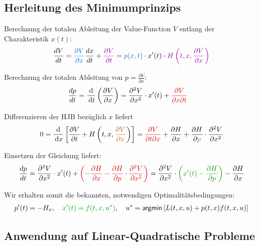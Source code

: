 \documentclass[a4paper, 12pt]{scrartcl}
\newcommand{\rot}[2][rot]{\textcolor{#1}{#2}}
\newcommand{\gruen}[2][gruen]{\textcolor{#1}{#2}}
\newcommand{\orange}[2][orange]{\textcolor{#1}{#2}}
\newcommand{\blau}[2][blau]{\textcolor{#1}{#2}}
\newcommand{\lila}[2][lila]{\textcolor{#1}{#2}}
\newcommand{\dx}{\thinspace \mathrm{d}x}
\newcommand{\dt}{\thinspace \mathrm{d}t}
\begin{document}
\subsection{Herleitung des Minimumprinzips}

Berechnung der totalen Ableitung der Value-Function $V$ entlang der Charakteristik $x(t)$:
%
\begin{align*}
\frac{dV}{dt} &= \blau{\frac{\partial V}{\partial x}} \frac{dx}{dt} + \lila{\frac{\partial V}{\partial t}} = \blau{p(x,t)} \cdot x'(t) \lila{- H\left( t,x , \frac{\partial V}{\partial x} \right)} \\
\end{align*}

Berechnung der totalen Ableitung von $p = \frac{\partial V}{\partial x}$:
%
\begin{align*}
\frac{dp}{dt} &= \frac{\mathrm{d}}{\dt} \left( \frac{\partial V}{\partial x} \right) =  \frac{\partial^2 V}{\partial x^2} \cdot x'(t) + \rot{\frac{\partial V}{\partial x \partial t}}
\end{align*}

Differenzieren der HJB bezüglich $x$ liefert
%
\begin{align*}
0 = \frac{\mathrm{d}}{\dx} \left[ \frac{\partial V}{\partial t} + H\left(t,x, \orange{ \frac{\partial V}{\partial x}} \right) \right] = \rot{\frac{\partial V}{\partial t \partial x}} + \frac{\partial H}{\partial x} + \frac{\partial H}{\partial \orange{p}} \cdot \frac{\partial^2 V}{\partial x^2}
\end{align*}

Einsetzen der Gleichung liefert:
%
\begin{align*}
\frac{dp}{dt} =  \frac{\partial^2 V}{\partial x^2} \cdot x'(t) + \rot{\left(- \frac{\partial H}{\partial x} - \frac{\partial H}{\partial p} \cdot \frac{\partial^2 V}{\partial x^2} \right)}
= \frac{\partial^2 V}{\partial x^2} \cdot \gruen{\left(x'(t) - \frac{\partial H}{\partial p} \right)} - \frac{\partial H}{\partial x}
\end{align*}

Wir erhalten somit die bekannten, notwendigen Optimalitätsbedingungen:
%
\begin{align*}
p'(t) = -H_x , \quad \gruen{x'(t) = f(t,x,u^*)}, \quad u^* = \textsf{argmin} \left[ L(t,x,u)+ p(t,x)f(t,x,u) \right]
\end{align*}

\subsection{Anwendung auf Linear-Quadratische Probleme}
\end{document}
